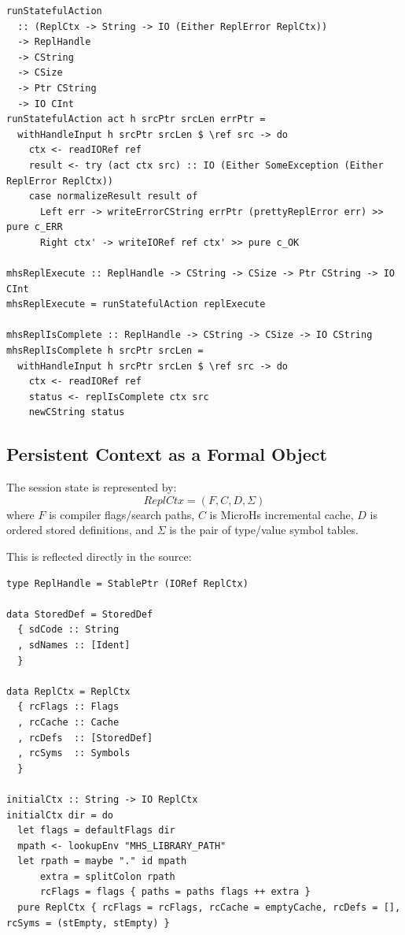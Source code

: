 \begin{verbatim}
runStatefulAction
  :: (ReplCtx -> String -> IO (Either ReplError ReplCtx))
  -> ReplHandle
  -> CString
  -> CSize
  -> Ptr CString
  -> IO CInt
runStatefulAction act h srcPtr srcLen errPtr =
  withHandleInput h srcPtr srcLen $ \ref src -> do
    ctx <- readIORef ref
    result <- try (act ctx src) :: IO (Either SomeException (Either ReplError ReplCtx))
    case normalizeResult result of
      Left err -> writeErrorCString errPtr (prettyReplError err) >> pure c_ERR
      Right ctx' -> writeIORef ref ctx' >> pure c_OK

mhsReplExecute :: ReplHandle -> CString -> CSize -> Ptr CString -> IO CInt
mhsReplExecute = runStatefulAction replExecute

mhsReplIsComplete :: ReplHandle -> CString -> CSize -> IO CString
mhsReplIsComplete h srcPtr srcLen =
  withHandleInput h srcPtr srcLen $ \ref src -> do
    ctx <- readIORef ref
    status <- replIsComplete ctx src
    newCString status
\end{verbatim}

\subsection{Persistent Context as a Formal Object}

The session state is represented by:
$$
ReplCtx = (F, C, D, \Sigma)
$$
where $F$ is compiler flags/search paths, $C$ is MicroHs incremental cache, $D$ is ordered stored definitions, and $\Sigma$ is the pair of type/value symbol tables.

This is reflected directly in the source:

\begin{verbatim}
type ReplHandle = StablePtr (IORef ReplCtx)

data StoredDef = StoredDef
  { sdCode :: String
  , sdNames :: [Ident]
  }

data ReplCtx = ReplCtx
  { rcFlags :: Flags
  , rcCache :: Cache
  , rcDefs  :: [StoredDef]
  , rcSyms  :: Symbols
  }

initialCtx :: String -> IO ReplCtx
initialCtx dir = do
  let flags = defaultFlags dir
  mpath <- lookupEnv "MHS_LIBRARY_PATH"
  let rpath = maybe "." id mpath
      extra = splitColon rpath
      rcFlags = flags { paths = paths flags ++ extra }
  pure ReplCtx { rcFlags = rcFlags, rcCache = emptyCache, rcDefs = [], rcSyms = (stEmpty, stEmpty) }
\end{verbatim}

